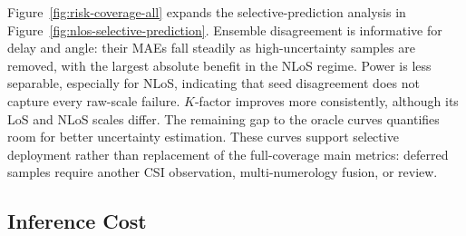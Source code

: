 Figure~\ref{fig:risk-coverage-all} expands the selective-prediction analysis in
Figure~\ref{fig:nlos-selective-prediction}. Ensemble disagreement is informative for delay and angle:
their MAEs fall steadily as high-uncertainty samples are removed, with the largest absolute benefit in
the NLoS regime. Power is less separable, especially for NLoS, indicating that seed disagreement does
not capture every raw-scale failure. $K$-factor improves more consistently, although its LoS and
NLoS scales differ. The remaining gap to the oracle curves quantifies room for better uncertainty
estimation. These curves support selective deployment rather than replacement of the full-coverage
main metrics: deferred samples require another CSI observation, multi-numerology fusion, or review.

\subsection{Inference Cost}

\begin{table}[t]
\centering
\caption{Physical quality on the inference-cost cohort. Decoder first-delay values can differ from
the learned-baseline table because this benchmark uses a different cohort; model suffixes make this explicit.}
\label{tab:complete-cost}
\scriptsize
\setlength{\tabcolsep}{2.2pt}
\end{table}

